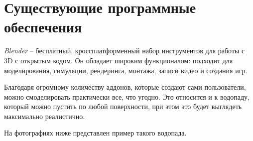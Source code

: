 



 

\section{Существующие программные обеспечения}
\textit{Blender} -- бесплатный, кроссплатформенный набор инструментов для работы с 3D с открытым кодом. Он обладает широким функционалом: подходит для моделирования, симуляции, рендеринга, монтажа, записи видео и создания игр.

Благодаря огромному количеству аддонов, которые создают сами пользователи, можно смоделировать практически все, что угодно. Это относится и к водопаду, который можно пустить по любой поверхности, при этом это будет выглядеть максимально реалистично.

На фотографиях ниже представлен пример такого водопада.
\clearpage

